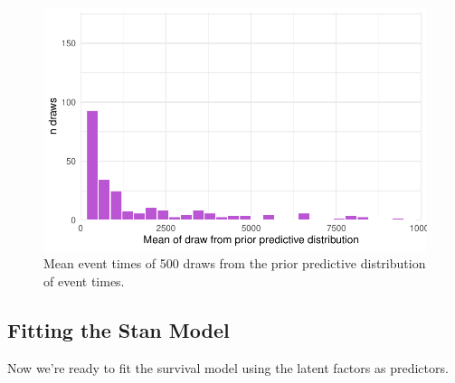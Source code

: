 \documentclass[
  letterpaper,
  DIV=11,
  numbers=noendperiod]{scrreprt}
\begin{document}
\begin{figure}[H]

{\centering \includegraphics{./bayesian-cfa_files/figure-pdf/prior-pred-1-means-1.pdf}

}

\caption{Mean event times of 500 draws from the prior predictive
distribution of event times.}

\end{figure}

\hypertarget{fitting-the-stan-model}{%
\subsection{Fitting the Stan Model}\label{fitting-the-stan-model}}

Now we're ready to fit the survival model using the latent factors as
predictors.
\end{document}
